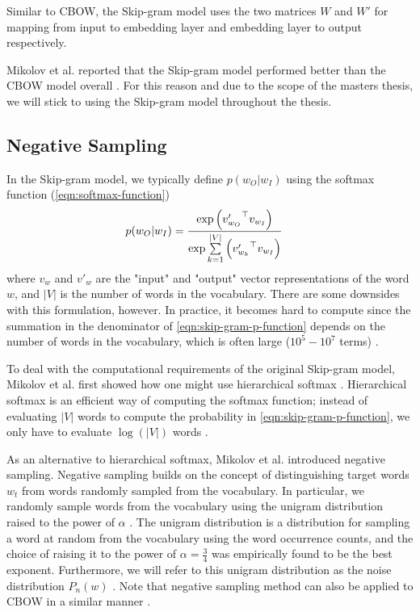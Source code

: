 Similar to CBOW, the Skip-gram model uses the two matrices $W$ and $W'$ for mapping from input to embedding layer and embedding layer to output respectively.

Mikolov et al. reported that the Skip-gram model performed better than the CBOW model overall \cite{mikolov2013a}. For this reason and due to the scope of the masters thesis, we will stick to using the Skip-gram model throughout the thesis.

\subsection{Negative Sampling}
In the Skip-gram model, we typically define $p(w_O | w_I)$ using the softmax function (\cref{eqn:softmax-function}) \cite{mikolov2013b}
\begin{align}
    p(w_O | w_I)
    &= \frac{\exp{ \left( {v'_{w_O}}^\top v_{w_I} \right) }} {\exp{ \sum\limits_{k=1}^{|V|} \left( {v'_{w_k}}^\top v_{w_I} \right) }}
    \label{eqn:skip-gram-p-function}
\end{align}
where $v_w$ and $v'_w$ are the "input" and "output" vector representations of the word $w$, and $|V|$ is the number of words in the vocabulary. There are some downsides with this formulation, however. In practice, it becomes hard to compute since the summation in the denominator of \cref{eqn:skip-gram-p-function} depends on the number of words in the vocabulary, which is often large ($10^5 - 10^7$ terms) \cite{mikolov2013b}.

To deal with the computational requirements of the original Skip-gram model, Mikolov et al. first showed how one might use hierarchical softmax \cite{mikolov2013b}. Hierarchical softmax is an efficient way of computing the softmax function; instead of evaluating $|V|$ words to compute the probability in \cref{eqn:skip-gram-p-function}, we only have to evaluate $\log \left( |V| \right)$ words \cite{mikolov2013b}.

As an alternative to hierarchical softmax, Mikolov et al. introduced negative sampling. Negative sampling builds on the concept of distinguishing target words $w_t$ from words randomly sampled from the vocabulary. In particular, we randomly sample words from the vocabulary using the unigram distribution raised to the power of $\alpha$ \cite{mikolov2013b}. The unigram distribution is a distribution for sampling a word at random from the vocabulary using the word occurrence counts, and the choice of raising it to the power of $\alpha = \frac{3}{4}$ was empirically found to be the best exponent. Furthermore, we will refer to this unigram distribution as the noise distribution $P_n(w)$ \cite{mikolov2013b}. Note that negative sampling method can also be applied to CBOW in a similar manner \cite{mikolov2013b}.

